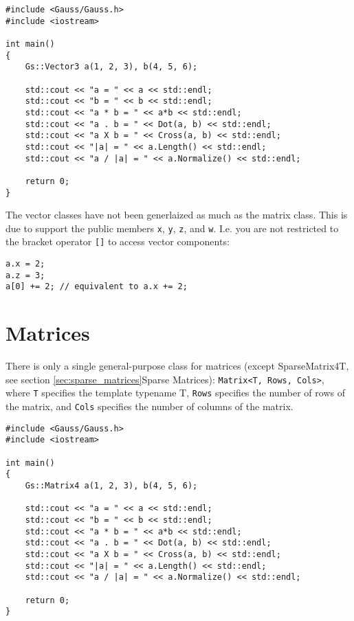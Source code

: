 \documentclass{article}
\begin{document}
\begin{lstlisting}
#include <Gauss/Gauss.h>
#include <iostream>

int main()
{
	Gs::Vector3 a(1, 2, 3), b(4, 5, 6);
	
	std::cout << "a = " << a << std::endl;
	std::cout << "b = " << b << std::endl;
	std::cout << "a * b = " << a*b << std::endl;
	std::cout << "a . b = " << Dot(a, b) << std::endl;
	std::cout << "a X b = " << Cross(a, b) << std::endl;
	std::cout << "|a| = " << a.Length() << std::endl;
	std::cout << "a / |a| = " << a.Normalize() << std::endl;
	
	return 0;
}
\end{lstlisting}
The vector classes have not been generlaized as much as the matrix class. This is due to support the public members
\texttt{x}, \texttt{y}, \texttt{z}, and \texttt{w}. I.e. you are not restricted to the bracket operator \texttt{[]}
to access vector components:
\begin{lstlisting}
a.x = 2;
a.z = 3;
a[0] += 2; // equivalent to a.x += 2;
\end{lstlisting}



\section*{Matrices}

There is only a single general-purpose class for matrices
(except SparseMatrix4T, see section \ref{sec:sparse_matrices}{Sparse Matrices}):
\texttt{Matrix<T, Rows, Cols>}, where \texttt{T} specifies the template typename T, \texttt{Rows} specifies the
number of rows of the matrix, and \texttt{Cols} specifies the number of columns of the matrix.

\begin{lstlisting}
#include <Gauss/Gauss.h>
#include <iostream>

int main()
{
	Gs::Matrix4 a(1, 2, 3), b(4, 5, 6);
	
	std::cout << "a = " << a << std::endl;
	std::cout << "b = " << b << std::endl;
	std::cout << "a * b = " << a*b << std::endl;
	std::cout << "a . b = " << Dot(a, b) << std::endl;
	std::cout << "a X b = " << Cross(a, b) << std::endl;
	std::cout << "|a| = " << a.Length() << std::endl;
	std::cout << "a / |a| = " << a.Normalize() << std::endl;
	
	return 0;
}
\end{lstlisting}
\end{document}
